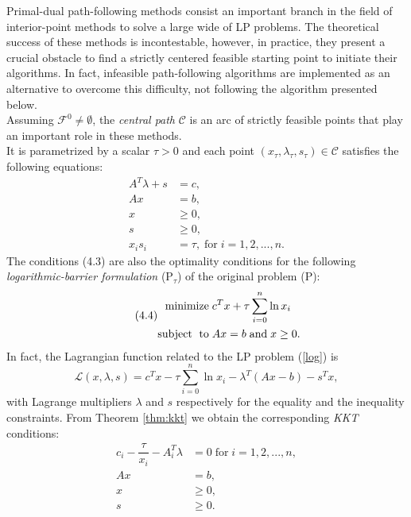 \documentclass[a4paper,10 pt,titlepage,twoside]{book}
\theoremstyle{plain}
\theoremstyle{definition}
\theoremstyle{remark}
\begin{document}
Primal-dual path-following methods consist an
important branch in the field of interior-point methods to solve a large wide of LP problems.
The theoretical success of these methods is incontestable, however, in practice, they present a crucial obstacle
to find a strictly centered feasible starting point to initiate their algorithms. In fact, infeasible path-following algorithms are implemented as an alternative to overcome this difficulty, not following the algorithm presented below.\\ Assuming $\mathcal{F}^{0}\neq \emptyset $, the \textit{central path} $\mathcal{C}$ is an arc of strictly feasible points that play an important role in these methods. \\It is parametrized by a scalar $\tau  > 0$ and each point $(x_{\tau}, \lambda_{\tau}, s_{\tau})\in \mathcal{C}$ satisfies the following equations:
\begin{align}
A^{T}\lambda+s&=c,\tag{4.3a}\\
Ax&=b,\tag{4.3b}\\\label{KKT2}
x&\geq 0,\tag{4.3c}\\
s&\geq 0,\tag{4.3d}\\
x_{i}s_{i}&= \tau,\; \text{for}\;i= 1,2,...,n.\tag{4.3e}\label{(Tao)}
\end{align} 
The conditions (4.3) are also the optimality conditions for the following \textit{logarithmic-barrier formulation} (P$_{\tau}$) of the original problem (P):
\begin{equation}\label{log}\tag{4.4}
\begin{split}
\text{minimize\;} &c^{T}x + \tau\sum_{i=0}^{n}\ln{x_{i}}\\
\text{subject\; to\;}&Ax = b\;\text{and\;} x\geq0.
\end{split}
\end{equation}
In fact, the Lagrangian function related to the LP problem (\ref{log}) is
\begin{equation*}
\mathcal{L}(x,\lambda,s)=c^{T}x- \tau\sum_{i=0}^{n}\ln{x_{i}}-\lambda^{T}\left(Ax-b\right)-s^{T}x,
\end{equation*}
with Lagrange multipliers $\lambda$ and $s$ respectively for the equality and the inequality constraints. From Theorem \ref{thm:kkt} we obtain the corresponding \textit{KKT} conditions:
\begin{align*}
c_{i} - \dfrac{\tau}{x_{i}} - A^{T}_{i}\lambda&= 0\; \text{for}\;i = 1,2,...,n,\\
Ax&=b,\\
x&\geq 0,\\
s&\geq 0.\\
\end{align*}  
\end{document}
